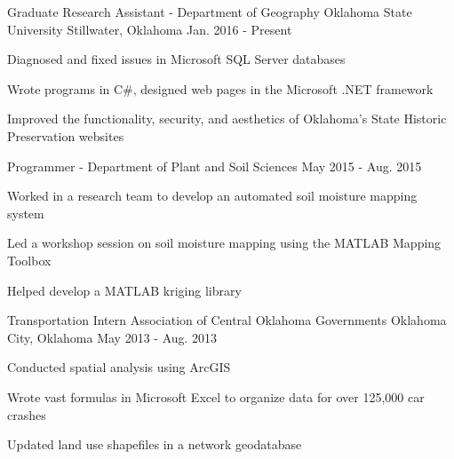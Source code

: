 \begin{cventries}
  \cventry
    {Graduate Research Assistant - Department of Geography}
    {Oklahoma State University}
    {Stillwater, Oklahoma}
    {Jan. 2016 - Present}
    {
      \begin{expitems}
        \item {Diagnosed and fixed issues in Microsoft SQL Server databases}
        \item {Wrote programs in C\#, designed web pages in the Microsoft .NET framework}
        \item {Improved the functionality, security, and aesthetics of
            Oklahoma's State Historic Preservation websites}
      \end{expitems}
    }

  \cventry
    {Programmer - Department of Plant and Soil Sciences}
    {}
    {}
    {May 2015 - Aug. 2015}
    {
      \begin{expitems}
      \item {Worked in a research team to develop an automated soil moisture
          mapping system}
        \item {Led a workshop session on soil moisture mapping using the MATLAB
            Mapping Toolbox}
        \item {Helped develop a MATLAB kriging library}
      \end{expitems}
    }

  \cventry
    {Transportation Intern}
    {Association of Central Oklahoma Governments}
    {Oklahoma City, Oklahoma}
    {May 2013 - Aug. 2013}
    {
      \begin{expitems}
        \item {Conducted spatial analysis using ArcGIS}
        \item {Wrote vast formulas in Microsoft Excel to organize data for over 125,000 car crashes}
        \item {Updated land use shapefiles in a network geodatabase}
      \end{expitems}
    }

\end{cventries}